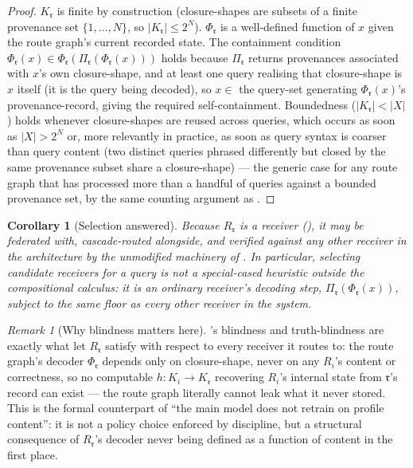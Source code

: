 \documentclass[11pt,twocolumn,a4paper]{article}
\theoremstyle{rdm}
\newtheorem{corollary}[theorem]{Corollary}
\theoremstyle{definition}
\theoremstyle{remark}
\newtheorem{remark}[theorem]{Remark}
\newcommand{\Cands}{X}
\newcommand{\Know}{K}
\newcommand{\Rec}{R}
\newcommand{\rg}{\mathfrak{r}}
\begin{document}
\begin{proof}
$\Know_\rg$ is finite by construction (closure-shapes are subsets of a
finite provenance set $\{1,\dots,N\}$, so $|\Know_\rg|\le 2^N$). $\Phi_\rg$
is a well-defined function of $x$ given the route graph's current recorded
state. The containment condition
$\Phi_\rg(x)\in\Phi_\rg(\Pi_\rg(\Phi_\rg(x)))$ holds because $\Pi_\rg$
returns provenances associated with $x$'s own closure-shape, and at least
one query realising that closure-shape is $x$ itself (it is the query being
decoded), so $x\in$ the query-set generating $\Phi_\rg(x)$'s
provenance-record, giving the required self-containment. Boundedness
($|\Know_\rg|<|\Cands|$) holds whenever closure-shapes are reused across
queries, which occurs as soon as $|\Cands|>2^N$ or, more relevantly in
practice, as soon as query syntax is coarser than query content (two
distinct queries phrased differently but closed by the same provenance
subset share a closure-shape) — the generic case for any route graph that
has processed more than a handful of queries against a bounded provenance
set, by the same counting argument as
\citet[Thm.~5.1]{sachikonye-accountable-compilation}.
\end{proof}

\begin{corollary}[Selection answered]
\label{cor:selection}
Because $\Rec_\rg$ is a receiver (), it may be
federated with, cascade-routed alongside, and verified against any other
receiver in the architecture by the unmodified machinery of
. In
particular, \emph{selecting} candidate receivers for a query is not a
special-cased heuristic outside the compositional calculus: it is an
ordinary receiver's decoding step, $\Pi_\rg(\Phi_\rg(x))$, subject to the
same floor as every other receiver in the system.
\end{corollary}

\begin{remark}[Why blindness matters here]
\label{rem:blindness-here}
\citet[Thm.~4.2, 4.3]{sachikonye-federated-context-closure}'s blindness and
truth-blindness are exactly what let $\Rec_\rg$ satisfy
 with respect to every receiver it routes to: the
route graph's decoder $\Phi_\rg$ depends only on closure-shape, never on any
$\Rec_i$'s content or correctness, so no computable $h:\Know_i\to\Know_\rg$
recovering $\Rec_i$'s internal state from $\rg$'s record can exist — the
route graph literally cannot leak what it never stored. This is the formal
counterpart of ``the main model does not retrain on profile content'': it
is not a policy choice enforced by discipline, but a structural consequence
of $\Rec_\rg$'s decoder never being defined as a function of content in the
first place.
\end{remark}
\end{document}

